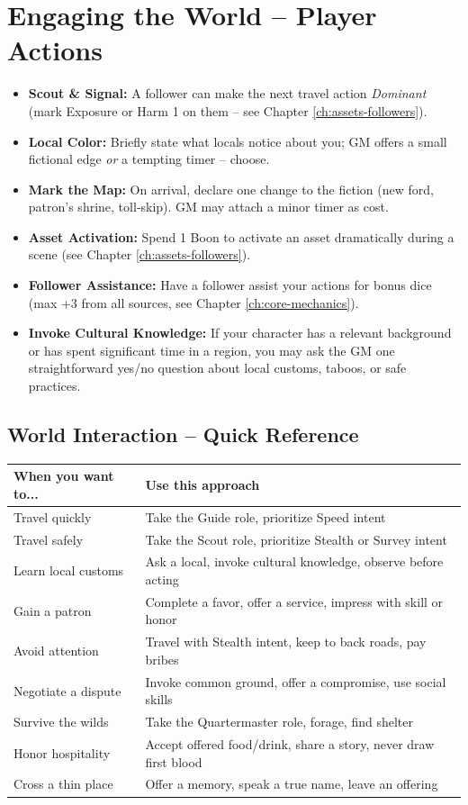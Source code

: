 \section{Engaging the World -- Player Actions}
\label{sec:player-actions-world}
\begin{itemize}
\item \textbf{Scout \& Signal:} A follower can make the next travel action \emph{Dominant} (mark Exposure or Harm 1 on them -- see Chapter \ref{ch:assets-followers}).
\item \textbf{Local Color:} Briefly state what locals notice about you; GM offers a small fictional edge \emph{or} a tempting timer -- choose.
\item \textbf{Mark the Map:} On arrival, declare one change to the fiction (new ford, patron's shrine, toll‑skip). GM may attach a minor timer as cost.
\item \textbf{Asset Activation:} Spend 1 Boon to activate an asset dramatically during a scene (see Chapter \ref{ch:assets-followers}).
\item \textbf{Follower Assistance:} Have a follower assist your actions for bonus dice (max +3 from all sources, see Chapter \ref{ch:core-mechanics}).
\item \textbf{Invoke Cultural Knowledge:} If your character has a relevant background or has spent significant time in a region, you may ask the GM one straightforward yes/no question about local customs, taboos, or safe practices.
\end{itemize}

\subsection*{World Interaction -- Quick Reference}
\label{sec:world-interaction-quickref}

\begin{center}
\begin{longtable}{ll}
\toprule
\textbf{When you want to...} & \textbf{Use this approach} \\
\midrule
Travel quickly & Take the Guide role, prioritize Speed intent \\
Travel safely & Take the Scout role, prioritize Stealth or Survey intent \\
Learn local customs & Ask a local, invoke cultural knowledge, observe before acting \\
Gain a patron & Complete a favor, offer a service, impress with skill or honor \\
Avoid attention & Travel with Stealth intent, keep to back roads, pay bribes \\
Negotiate a dispute & Invoke common ground, offer a compromise, use social skills \\
Survive the wilds & Take the Quartermaster role, forage, find shelter \\
Honor hospitality & Accept offered food/drink, share a story, never draw first blood \\
Cross a thin place & Offer a memory, speak a true name, leave an offering \\
\bottomrule
\end{longtable}
\end{center}


